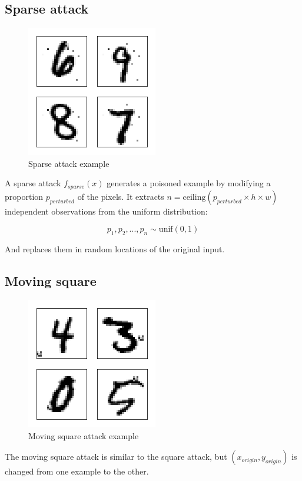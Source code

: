 \documentclass[letterpaper, 10 pt, conference]{ieeeconf}  %
\begin{document}
\subsection{Sparse attack}

\begin{figure}[h]
\caption{Sparse attack example}
\centering
\includegraphics{sparse.png}
\end{figure}

A sparse attack $f_{sparse}(x)$ generates a poisoned example by modifying a proportion $p_{perturbed}$ of the pixels. It extracts $n = \text{ceiling}(p_{perturbed} \times h \times w)$ independent observations from the uniform distribution:

$$p_1, p_2,...,p_{n}\sim \text{unif}(0, 1)$$

And replaces them in random locations of the original input.

\subsection{Moving square}

\begin{figure}[h]
\caption{Moving square attack example}
\centering
\includegraphics{moving-square.png}
\end{figure}


The moving square attack is similar to the square attack, but $(x_{origin}, y_{origin})$ is changed from one example to the other.
\end{document}
